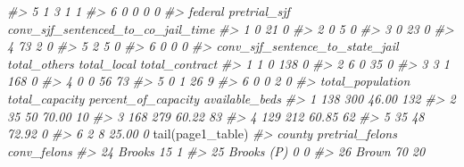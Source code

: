 \documentclass[
]{krantz}
\makeatletter
\newenvironment{Shaded}{\begin{snugshade}}{\end{snugshade}}
\newcommand{\CommentTok}[1]{\textcolor[rgb]{0.37,0.37,0.37}{\textit{#1}}}
\newcommand{\FunctionTok}[1]{\textcolor[rgb]{0,0,0}{#1}}
\newcommand{\NormalTok}[1]{#1}
\newenvironment{kframe}{%
\medskip{}
\setlength{\fboxsep}{.8em}
 \def\at@end@of@kframe{}%
 \ifinner\ifhmode%
  \def\at@end@of@kframe{\end{minipage}}%
  \begin{minipage}{\columnwidth}%
 \fi\fi%
 \def\FrameCommand##1{\hskip\@totalleftmargin \hskip-\fboxsep
 \colorbox{shadecolor}{##1}\hskip-\fboxsep
     \hskip-\linewidth \hskip-\@totalleftmargin \hskip\columnwidth}%
 \MakeFramed {\advance\hsize-\width
   \@totalleftmargin\z@ \linewidth\hsize
   \@setminipage}}%
 {\par\unskip\endMakeFramed%
 \at@end@of@kframe}
\renewenvironment{Shaded}{\begin{kframe}}{\end{kframe}}
\makeatother
\begin{document}
\begin{Shaded}
\begin{Highlighting}[]
\CommentTok{\#\textgreater{} 5                                  1             3         1              1}
\CommentTok{\#\textgreater{} 6                                  0             0         0              0}
\CommentTok{\#\textgreater{}   federal pretrial\_sjf conv\_sjf\_sentenced\_to\_co\_jail\_time}
\CommentTok{\#\textgreater{} 1       0           21                                  0}
\CommentTok{\#\textgreater{} 2       0            5                                  0}
\CommentTok{\#\textgreater{} 3       0           23                                  0}
\CommentTok{\#\textgreater{} 4      73            2                                  0}
\CommentTok{\#\textgreater{} 5       2            5                                  0}
\CommentTok{\#\textgreater{} 6       0            0                                  0}
\CommentTok{\#\textgreater{}   conv\_sjf\_sentence\_to\_state\_jail total\_others total\_local total\_contract}
\CommentTok{\#\textgreater{} 1                               1            0         138              0}
\CommentTok{\#\textgreater{} 2                               6            0          35              0}
\CommentTok{\#\textgreater{} 3                               3            1         168              0}
\CommentTok{\#\textgreater{} 4                               0            0          56             73}
\CommentTok{\#\textgreater{} 5                               0            1          26              9}
\CommentTok{\#\textgreater{} 6                               0            0           2              0}
\CommentTok{\#\textgreater{}   total\_population total\_capacity percent\_of\_capacity available\_beds}
\CommentTok{\#\textgreater{} 1              138            300               46.00            132}
\CommentTok{\#\textgreater{} 2               35             50               70.00             10}
\CommentTok{\#\textgreater{} 3              168            279               60.22             83}
\CommentTok{\#\textgreater{} 4              129            212               60.85             62}
\CommentTok{\#\textgreater{} 5               35             48               72.92              0}
\CommentTok{\#\textgreater{} 6                2              8               25.00              0}
\FunctionTok{tail}\NormalTok{(page1\_table)}
\CommentTok{\#\textgreater{}        county pretrial\_felons conv\_felons}
\CommentTok{\#\textgreater{} 24     Brooks              15           1}
\CommentTok{\#\textgreater{} 25 Brooks (P)               0           0}
\CommentTok{\#\textgreater{} 26      Brown              70          20}

\end{Highlighting}
\end{Shaded}
\end{document}
